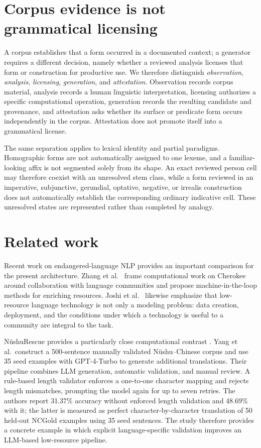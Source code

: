 \documentclass[11pt]{article}
\begin{document}
\section{Corpus evidence is not grammatical licensing}
\label{sec:evidence}

A corpus establishes that a form occurred in a documented context; a generator
requires a different decision, namely whether a reviewed analysis licenses that
form or construction for productive use. We therefore distinguish
\emph{observation}, \emph{analysis}, \emph{licensing}, \emph{generation},
and \emph{attestation}. Observation records corpus material, analysis records a
human linguistic interpretation, licensing authorizes a specific computational
operation, generation records the resulting candidate and provenance, and
attestation asks whether its surface or predicate form occurs independently in
the corpus. Attestation does not promote itself into a grammatical license.

The same separation applies to lexical identity and partial paradigms.
Homographic forms are not automatically assigned to one lexeme, and a
familiar-looking affix is not segmented solely from its shape. An exact reviewed
person cell may therefore coexist with an unresolved stem class, while a form
reviewed in an imperative, subjunctive, gerundial, optative, negative, or irrealis
construction does not automatically establish the corresponding ordinary
indicative cell. These unresolved states are represented rather than completed
by analogy.

\section{Related work}
\label{sec:related}

Recent work on endangered-language NLP provides an important comparison for
the present architecture. Zhang et al.~\cite{zhang2022cherokee} frame
computational work on Cherokee around collaboration with language communities
and propose machine-in-the-loop methods for enriching resources. Joshi
et al.~\cite{joshi2019unsung} likewise emphasize that low-resource language
technology is not only a modeling problem: data creation, deployment, and the
conditions under which a technology is useful to a community are integral to
the task.

NüshuRescue provides a particularly close computational contrast
\cite{yang2025nushurescue}. Yang et al.\ construct a 500-sentence manually
validated Nüshu--Chinese corpus and use 35 seed examples with GPT-4-Turbo to
generate additional translations. Their pipeline combines LLM generation,
automatic validation, and manual review. A rule-based length validator enforces a one-to-one character mapping and
rejects length mismatches, prompting the model again for up to seven retries.
The authors report 31.37\% accuracy without enforced length validation and
48.69\% with it; the latter is measured as perfect character-by-character
translation of 50 held-out NCGold examples using 35 seed sentences. The study
therefore provides a concrete example in which explicit language-specific
validation improves an LLM-based low-resource pipeline.
\end{document}
